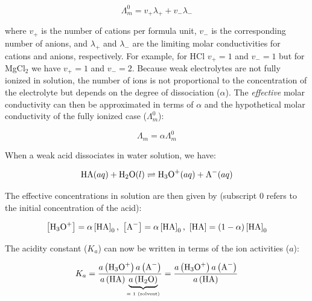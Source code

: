 \documentclass[byrevtex,amssymb,aps,pra,floatfix,letterpaper]{revtex4}
\begin{document}
\begin{equation}
\Lambda_m^0 = v_+\lambda_+ + v_-\lambda_-
\label{eq6}
\end{equation}

\noindent
where $v_+$ is the number of cations per formula unit, $v_-$ is the corresponding number of anions, and $\lambda_+$ and $\lambda_-$ are the limiting molar conductivities for cations and anions, respectively. For example, for HCl $v_+ = 1$ and $v_- = 1$ but for MgCl$_2$ we have $v_+ = 1$ and $v_- = 2$. Because weak electrolytes are not fully ionized in solution, the number of ions is not proportional to the concentration of the electrolyte but depends on the degree of dissociation ($\alpha$). The \textit{effective} molar conductivity can then be approximated in terms of $\alpha$ and the hypothetical molar conductivity of the fully ionized case ($\Lambda_m^0$):

\begin{equation}
\Lambda_m = \alpha\Lambda_m^0
\label{eq7}
\end{equation}

\noindent
When a weak acid dissociates in water solution, we have:

\begin{equation}
\textnormal{HA}(aq) + \textnormal{H}_2\textnormal{O}(l) \rightleftharpoons \textnormal{H}_3\textnormal{O}^+(aq) + \textnormal{A}^-(aq)
\label{eq8}
\end{equation}

\noindent
The effective concentrations in solution are then given by (subscript 0 refers to the initial concentration of the acid):

\begin{equation}
\left[\textnormal{H}_3\textnormal{O}^+\right] = \alpha\left[\textnormal{HA}\right]_0\textnormal{, }\left[\textnormal{A}^-\right] = \alpha\left[\textnormal{HA}\right]_0\textnormal{, }\left[\textnormal{HA}\right] = \left(1 - \alpha\right)\left[\textnormal{HA}\right]_0
\label{eq9}
\end{equation}

\noindent
The acidity constant ($K_a$) can now be written in terms of the ion activities ($a$):

\begin{equation}
K_a = \frac{a\left(\textnormal{H}_3\textnormal{O}^+\right)a\left(\textnormal{A}^-\right)}{a\left(\textnormal{HA}\right)\underbrace{a\left(\textnormal{H}_2\textnormal{O}\right)}_\textnormal{\tiny = 1 (solvent)}} = \frac{a\left(\textnormal{H}_3\textnormal{O}^+\right)a\left(\textnormal{A}^-\right)}{a\left(\textnormal{HA}\right)}
\label{eq10}
\end{equation}
\end{document}
